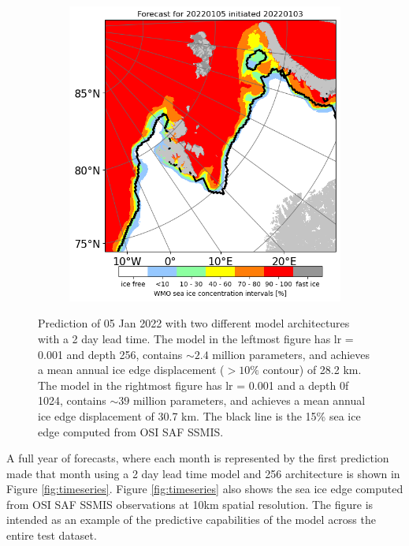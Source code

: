 \documentclass[../main/thesis]{subfiles}
\begin{document}
\begin{figure}
\begin{subfigure}[t]{0.455\textwidth}
        \includegraphics[width=\textwidth, valign=t]{unet_1024_jan}
    \end{subfigure}
    \caption{Prediction of 05 Jan 2022 with two different model architectures with a 2 day lead time. The model in the leftmost figure has lr = 0.001 and depth 256, contains $\sim 2.4$ million parameters, and achieves a mean annual ice edge displacement ($>10\%$ contour) of 28.2 km. The model in the rightmost figure has lr = 0.001 and a depth 0f 1024, contains $\sim 39$ million parameters, and achieves a mean annual ice edge displacement of 30.7 km. The black line is the 15\% sea ice edge computed from OSI SAF SSMIS.}
    \label{fig:256_1024_compare}
\end{figure}

A full year of forecasts, where each month is represented by the first prediction made that month using a 2 day lead time model and 256 architecture is shown in Figure \ref{fig:timeseries}. Figure \ref{fig:timeseries} also shows the sea ice edge computed from OSI SAF SSMIS observations at 10km spatial resolution. The figure is intended as an example of the predictive capabilities of the model across the entire test dataset. 
\end{document}
